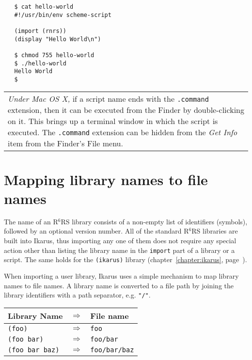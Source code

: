 \documentclass[onecolumn, 12pt, twoside, openright, dvipdfm]{book}
\newcommand{\rnrs}[1]{R$^{\mathrm{#1}}$RS}
\newcommand{\BoxedText}[2]{
  \vspace{.05in}
  \begin{center}
    \begin{tabular}{|p{4.6in}|} {\large \emph{#1}} #2 \end{tabular}
  \end{center}
  \vspace{.05in}
}
\begin{document}
\begin{verbatim}
   $ cat hello-world
   #!/usr/bin/env scheme-script
   
   (import (rnrs))
   (display "Hello World\n")
   
   $ chmod 755 hello-world
   $ ./hello-world
   Hello World
   $
\end{verbatim}

\BoxedText{Under Mac OS X,}{if a script name ends with the
\texttt{.command} extension, then it can be executed from the Finder
by double-clicking on it.  This brings up a terminal window in which
the script is executed.  The \texttt{.command} extension can be
hidden from the \emph{Get Info} item from the Finder's File menu.}

\newpage

\section{Mapping library names to file names}

The name of an \rnrs{6} library consists of a non-empty list of
identifiers (symbols), followed by an optional version number.  All
of the standard \rnrs{6} libraries are built into Ikarus, thus
importing any one of them does not require any special action other
than listing the library name in the \texttt{import} part of a
library or a script.  The same holds for the \texttt{(ikarus)}
library (chapter~\ref{chapter:ikarus},
page~\pageref{chapter:ikarus}).

When importing a user library, Ikarus uses a simple mechanism
to map library names to file names.  A library name is converted to
a file path by joining the library identifiers with a path
separator, e.g. \verb|"/"|.

\begin{center}
\begin{tabular}{lcl}
  Library Name & \hspace{2em}$\Rightarrow$\hspace{2em} & File name \\
  \hline
  \verb|(foo)|         & $\Rightarrow$ & \verb|foo| \\
  \verb|(foo bar)|     & $\Rightarrow$ & \verb|foo/bar| \\
  \verb|(foo bar baz)| & $\Rightarrow$ & \verb|foo/bar/baz| 
\end{tabular}
\end{center}
\end{document}

